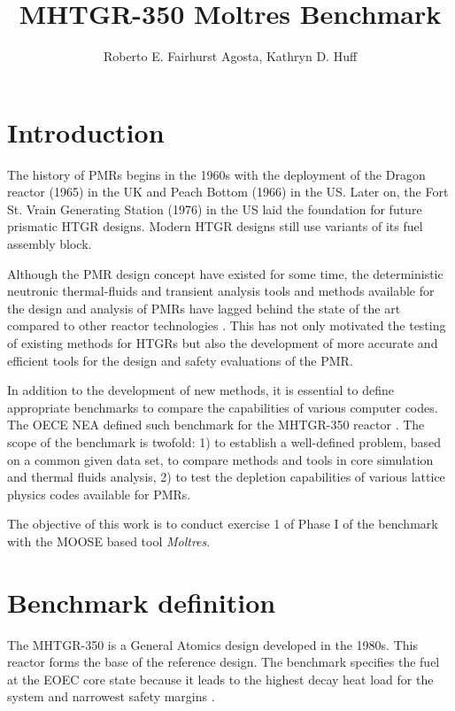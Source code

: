 \documentclass{anstrans}
\title{MHTGR-350 Moltres Benchmark}
\author{Roberto E. Fairhurst Agosta, Kathryn D. Huff}
\institute{
University of Illinois at Urbana-Champaign, Dept. of Nuclear, Plasma, and Radiological Engineering\\
ref3@illinois.edu
}
\begin{document}
\section{Introduction}

The history of \glspl{PMR} begins in the 1960s with the deployment of the Dragon reactor (1965) in the \gls{UK} and Peach Bottom (1966) in the \gls{US}.
Later on, the Fort St. Vrain Generating Station (1976) in the \gls{US} laid the foundation for future prismatic \gls{HTGR} designs.
Modern \gls{HTGR} designs still use variants of its fuel assembly block.

Although the \gls{PMR} design concept have existed for some time, the deterministic neutronic thermal-fluids and transient analysis tools and methods available for the  design and analysis of \glspl{PMR} have lagged behind the state of the art compared to other reactor technologies \cite{oecd_nea_benchmark_2017}.
This has not only motivated the testing of existing methods for \glspl{HTGR} but also the development of more accurate and efficient tools for the design and safety evaluations of the \gls{PMR}.

In addition to the development of new methods, it is essential to define appropriate benchmarks to compare the capabilities of various computer codes.
The OECE \gls{NEA} defined such benchmark for the MHTGR-350 reactor \cite{oecd_nea_benchmark_2017}.
The scope of the benchmark is twofold: 1) to establish a well-defined problem, based on a common given data set, to compare methods and tools in core simulation and thermal fluids analysis, 2) to test the depletion capabilities of various lattice physics codes available for \glspl{PMR}.

The objective of this work is to conduct exercise 1 of Phase I of the benchmark with the \gls{MOOSE} \cite{gaston_physics-based_2015} based tool \textit{Moltres}\cite{lindsay_introduction_2018}.

\section{Benchmark definition}

The MHTGR-350 is a General Atomics design developed in the 1980s.
This reactor forms the base of the reference design.
The benchmark specifies the fuel at the \gls{EOEC} core state because it leads to the highest decay heat load for the system and narrowest safety margins \cite{ortensi_prismatic_2011}.
\end{document}
